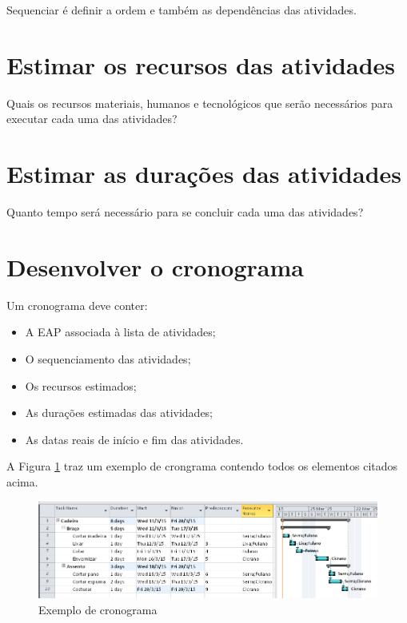Sequenciar é definir a ordem e também as dependências das atividades.

\section{Estimar os recursos das atividades}

Quais os recursos materiais, humanos e tecnológicos que serão necessários para executar cada uma das atividades?

\section{Estimar as durações das atividades}

Quanto tempo será necessário para se concluir cada uma das atividades?

\section{Desenvolver o cronograma}

Um cronograma deve conter:

\begin{itemize}

\item A EAP associada à lista de atividades;

\item O sequenciamento das atividades;

\item Os recursos estimados;

\item As durações estimadas das atividades;

\item As datas reais de início e fim das atividades.

\end{itemize}

A Figura \ref{fig:ativ:ex} traz um exemplo de crongrama contendo todos os elementos citados acima.

\begin{figure}[!h]
\centering
\includegraphics[scale=0.45]{Figuras/ativ_exemplo.png}
\caption{Exemplo de cronograma}
\label{fig:ativ:ex}
\end{figure}